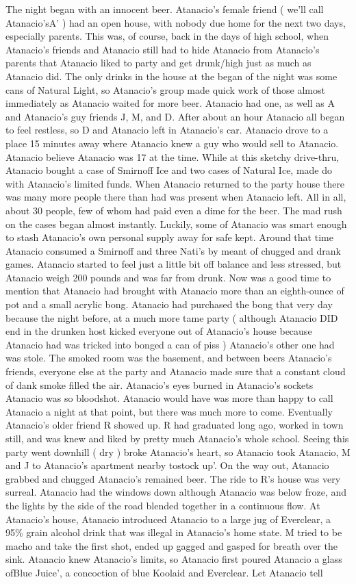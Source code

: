 \documentclass[12pt]{book}
\begin{document}
The night began with an innocent beer. Atanacio's female friend ( we'll call Atanacio'sA' ) had an open house, with nobody due home for the next two days, especially parents. This was, of course, back in the days of high school, when Atanacio's friends and Atanacio still had to hide Atanacio from Atanacio's parents that Atanacio liked to party and get drunk/high just as much as Atanacio did. The only drinks in the house at the began of the night was some cans of Natural Light, so Atanacio's group made quick work of those almost immediately as Atanacio waited for more beer. Atanacio had one, as well as A and Atanacio's guy friends J, M, and D. After about an hour Atanacio all began to feel restless, so D and Atanacio left in Atanacio's car. Atanacio drove to a place 15 minutes away where Atanacio knew a guy who would sell to Atanacio. Atanacio believe Atanacio was 17 at the time. While at this sketchy drive-thru, Atanacio bought a case of Smirnoff Ice and two cases of Natural Ice, made do with Atanacio's limited funds. When Atanacio returned to the party house there was many more people there than had was present when Atanacio left. All in all, about 30 people, few of whom had paid even a dime for the beer. The mad rush on the cases began almost instantly. Luckily, some of Atanacio was smart enough to stash Atanacio's own personal supply away for safe kept. Around that time Atanacio consumed a Smirnoff and three Nati's by meant of chugged and drank games. Atanacio started to feel just a little bit off balance and less stressed, but Atanacio weigh 200 pounds and was far from drunk. Now was a good time to mention that Atanacio had brought with Atanacio more than an eighth-ounce of pot and a small acrylic bong. Atanacio had purchased the bong that very day because the night before, at a much more tame party ( although Atanacio DID end in the drunken host kicked everyone out of Atanacio's house because Atanacio had was tricked into bonged a can of piss ) Atanacio's other one had was stole. The smoked room was the basement, and between beers Atanacio's friends, everyone else at the party and Atanacio made sure that a constant cloud of dank smoke filled the air. Atanacio's eyes burned in Atanacio's sockets Atanacio was so bloodshot. Atanacio would have was more than happy to call Atanacio a night at that point, but there was much more to come. Eventually Atanacio's older friend R showed up. R had graduated long ago, worked in town still, and was knew and liked by pretty much Atanacio's whole school. Seeing this party went downhill ( dry ) broke Atanacio's heart, so Atanacio took Atanacio, M and J to Atanacio's apartment nearby tostock up'. On the way out, Atanacio grabbed and chugged Atanacio's remained beer. The ride to R's house was very surreal. Atanacio had the windows down although Atanacio was below froze, and the lights by the side of the road blended together in a continuous flow. At Atanacio's house, Atanacio introduced Atanacio to a large jug of Everclear, a 95\% grain alcohol drink that was illegal in Atanacio's home state. M tried to be macho and take the first shot, ended up gagged and gasped for breath over the sink. Atanacio knew Atanacio's limits, so Atanacio first poured Atanacio a glass ofBlue Juice', a concoction of blue Koolaid and Everclear. Let Atanacio tell 
\end{document}
